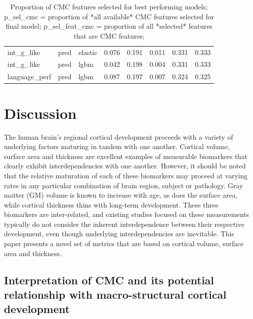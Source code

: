 \documentclass{article}
\begin{document}
\begin{table}
\begin{tabular}{lllrrrrr}
	int\_g\_like & pred & elastic & 0.076 & 0.191 & 0.011 & 0.331 & 0.333 \\
	int\_g\_like & pred & lgbm & 0.042 & 0.198 & 0.004 & 0.331 & 0.333 \\
	language\_perf & pred & lgbm & 0.087 & 0.197 & 0.007 & 0.324 & 0.325 \\
	\bottomrule
\end{tabular}
\footnotesize
\caption{Proportion of CMC features selected for best performing models;
p\_sel\_cmc = proportion of *all available* CMC features selected for final model;
p\_sel\_feat\_cmc = proportion of all *selected* features that are CMC features;
}
\normalsize
\label{tab:cmc-feature-select}
\end{table}


\section{Discussion} \label{sec:discussion}

The human brain's regional cortical development proceeds with a variety of
underlying factors maturing in tandem with one another. Cortical volume,
surface area and thickness are excellent examples of measurable biomarkers
that clearly exhibit interdependencies with one another. However, it should
be noted that the relative maturation of each of these biomarkers may proceed
at varying rates in any particular combination of brain region, subject or
pathology. Gray matter (GM) volume is known to increase with age, as does the
surface area, while cortical thickness thins with long-term development.
These three biomarkers are inter-related, and existing studies focused on
these measurements typically do not consider the inherent interdependence
between their respective development, even though underlying
interdependencies are inevitable. This paper presents a novel set of metrics
that are based on cortical volume, surface area and thickness.

\subsection{Interpretation of CMC and its potential relationship with macro-structural cortical development}
\end{document}
